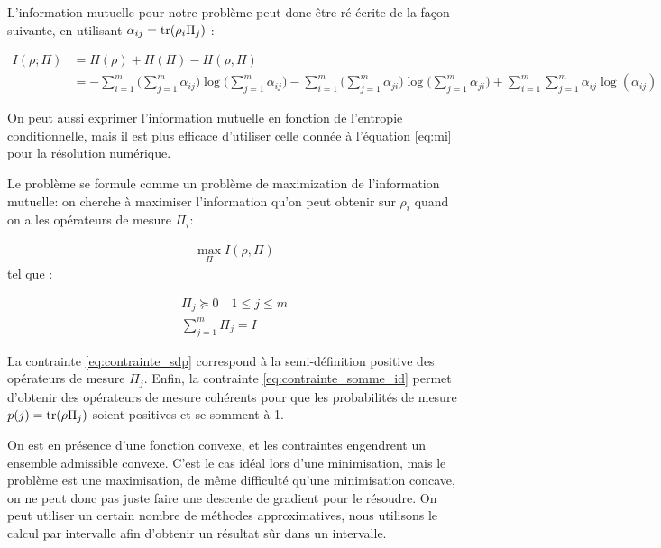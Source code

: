 L'information mutuelle pour notre problème peut donc être ré-écrite de la façon suivante, en utilisant $\alpha_{ij} = \operatorname{tr}(\rho_i \Pi_j)$ :

\begin{align}
    \label{eq:mi}
    I(\rho; \Pi) &= H(\rho) + H(\Pi) - H(\rho, \Pi) \nonumber \\
    &= - \displaystyle \sum_{i=1}^{m} \big(\displaystyle \sum_{j=1}^{m} \alpha_{ij} \big) \log \big( \displaystyle \sum_{j=1}^{m} \alpha_{ij} \big) - \displaystyle \sum_{i=1}^{m} \big(\displaystyle \sum_{j=1}^{m} \alpha_{ji} \big) \log \big( \displaystyle \sum_{j=1}^{m} \alpha_{ji}\big) + \displaystyle \sum_{i=1}^{m} \displaystyle \sum_{j=1}^{m} \alpha_{ij} \log( \alpha_{ij} )
\end{align}

On peut aussi exprimer l'information mutuelle en fonction de l'entropie conditionnelle, mais il est plus efficace d'utiliser celle donnée à l'équation \ref{eq:mi} pour la résolution numérique.

Le problème se formule comme un problème de maximization de l'information mutuelle: on cherche à maximiser l'information qu'on peut obtenir sur $\rho_i$ quand on a les opérateurs de mesure $\Pi_i$:

\begin{align}
    \max\limits_{\Pi} I(\rho, \Pi)
\end{align}
tel que :

\begin{align}
    \Pi_j \succeq 0 \quad 1 \leq j \leq m \label{eq:contrainte_sdp} \\
    \displaystyle \sum_{j=1}^{m} \Pi_j = I \label{eq:contrainte_somme_id}
\end{align}

La contrainte \ref{eq:contrainte_sdp} correspond à la semi-définition positive des opérateurs de mesure $\Pi_j$. Enfin, la contrainte \ref{eq:contrainte_somme_id} permet d'obtenir des opérateurs de mesure cohérents pour que les probabilités de mesure $p(j) = \operatorname{tr} (\rho \Pi_j)$ soient positives et se somment à 1.

On est en présence d'une fonction convexe, et les contraintes engendrent un ensemble admissible convexe. C'est le cas idéal lors d'une minimisation, mais le problème est une maximisation, de même difficulté qu'une minimisation concave, on ne peut donc pas juste faire une descente de gradient pour le résoudre. On peut utiliser un certain nombre de méthodes approximatives, nous utilisons le calcul par intervalle afin d'obtenir un résultat sûr dans un intervalle.

